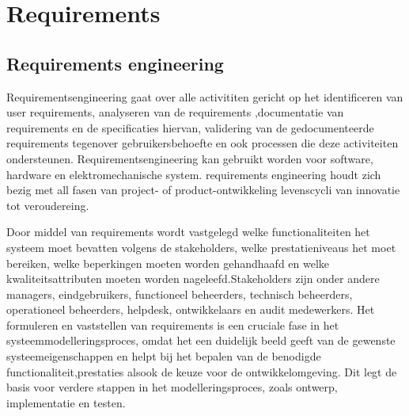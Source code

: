 \documentclass{article}
\begin{document}
	
	
	\section{Requirements}
	\subsection{Requirements engineering}
	
	Requirementsengineering gaat over alle activititen gericht op het identificeren van user requirements, analyseren van  de requirements ,documentatie van requirements en de specificaties hiervan, validering 	van de gedocumenteerde requirements tegenover gebruikersbehoefte en ook processen die deze activiteiten ondersteunen.
	Requirementsengineering kan gebruikt worden voor software, hardware en elektromechanische system. 
	requirements engineering houdt zich bezig met all fasen van project- of product-ontwikkeling levenscycli van innovatie tot veroudereing.
	
	
	Door middel van requirements wordt vastgelegd welke functionaliteiten het systeem moet bevatten volgens de stakeholders, welke prestatieniveaus het moet bereiken, welke beperkingen moeten worden gehandhaafd en welke kwaliteitsattributen moeten worden nageleefd.Stakeholders zijn onder andere managers, eindgebruikers, functioneel beheerders, technisch beheerders, operationeel beheerders, helpdesk, ontwikkelaars en audit medewerkers. Het formuleren en vaststellen van requirements is een cruciale fase in het systeemmodelleringsproces, omdat het een duidelijk beeld geeft van de gewenste systeemeigenschappen en helpt bij het bepalen van de benodigde functionaliteit,prestaties alsook de keuze voor de ontwikkelomgeving. Dit legt de basis voor verdere stappen in het modelleringsproces, zoals ontwerp, implementatie en testen. 
	
\end{document}
